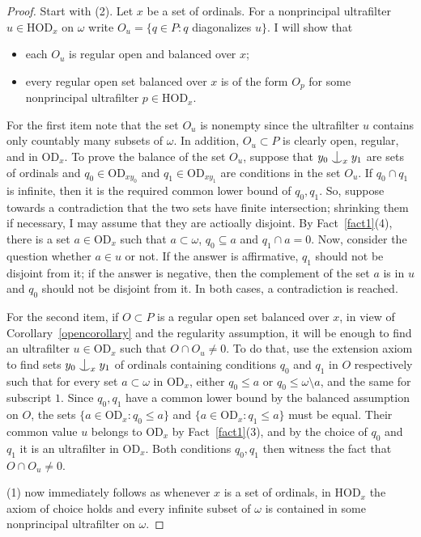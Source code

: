 \documentclass{article}
\newcommand{\gw}{\omega}
\newcommand{\hvd}{\mathrm{HOD}}
\newcommand{\vd}{\mathrm{OD}}
\newcommand{\forkindep}[1][]{%
  \mathrel{
    \mathop{
      \vcenter{
        \hbox{\oalign{\noalign{\kern-.3ex}\hfil$\vert$\hfil\cr
              \noalign{\kern-.7ex}
              $\smile$\cr\noalign{\kern-.3ex}}}
      }
    }\displaylimits_{#1}
  }
}
\theoremstyle{definition}
\begin{document}
\begin{proof}
Start with (2). Let $x$ be a set of ordinals. For a nonprincipal ultrafilter $u\in\hvd_x$ on $\gw$ write $O_u=\{q\in P\colon q$ diagonalizes $u\}$. I will show that 

\begin{itemize}
\item each $O_u$ is regular open and balanced over $x$;
\item every regular open set balanced over $x$ is of the form $O_p$ for some nonprincipal ultrafilter $p\in\hvd_x$.
\end{itemize}

For the first item note that the set $O_u$ is nonempty since the ultrafilter $u$ contains only countably many subsets of $\gw$. In addition, $O_u\subset P$ is clearly open, regular, and in $\vd_x$. To prove the balance of the set $O_u$, suppose that $y_0\forkindep[x]y_1$ are sets of ordinals and $q_0\in \vd_{xy_0}$ and $q_1\in\vd_{xy_1}$ are conditions in the set $O_u$. If $q_0\cap q_1$ is infinite, then it is the required common lower bound of $q_0, q_1$. So, suppose towards a contradiction that the two sets have finite intersection; shrinking them if necessary, I may assume that they are actioally disjoint. By  Fact~\ref{fact1}(4), there is a set $a\in\vd_x$ such that $a\subset\gw$, $q_0\subseteq a$ and $q_1\cap a=0$. Now, consider the question whether $a\in u$ or not. If the answer is affirmative, $q_1$ should not be disjoint from it; if the answer is negative, then the complement of the set $a$ is in $u$ and $q_0$ should not be disjoint from it. In both cases, a contradiction is reached.

For the second item, if $O\subset P$ is a regular open set balanced over $x$, in view of Corollary~\ref{opencorollary} and the regularity assumption, it will be enough to find an ultrafilter $u\in\vd_x$ such that $O\cap O_u\neq 0$. To do that, use the extension axiom to find sets $y_0\forkindep[x]y_1$ of ordinals containing conditions $q_0$ and $q_1$ in $O$ respectively such that for every set $a\subset\gw$ in $\vd_x$, either $q_0\leq a$ or $q_0\leq\gw\setminus a$, and the same for subscript $1$. Since $q_0, q_1$ have a common lower bound  by the balanced assumption on $O$, the sets $\{a\in\vd_x\colon q_0\leq a\}$ and $\{a\in\vd_x\colon q_1\leq a\}$ must be equal. Their common value $u$ belongs to $\vd_x$ by Fact~\ref{fact1}(3), and by the choice of $q_0$ and $q_1$ it is an ultrafilter in $\vd_x$. Both conditions $q_0, q_1$ then witness the fact that $O\cap O_u\neq 0$.

(1) now immediately follows as whenever $x$ is a set of ordinals, in $\hvd_x$ the axiom of choice holds and every infinite subset of $\gw$ is contained in some nonprincipal ultrafilter on $\gw$.
\end{proof}
\end{document}

